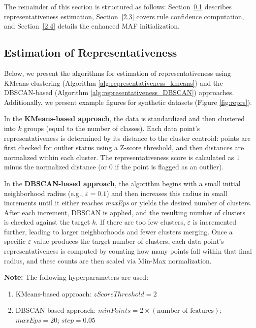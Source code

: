 \documentclass[10pt,a4paper,oneside]{article}
\begin{document}
{\color{red}The remainder of this section is structured as follows: Section~\ref{1.2.1} describes representativeness estimation, Section~\ref{2.3} covers rule confidence computation, and Section~\ref{2.4} details the enhanced MAF initialization.}
\subsection{Estimation of Representativeness}\label{1.2.1}
Below, we present the algorithms for estimation of representativeness using KMeans clustering (Algorithm \ref{alg:representativeness_kmeans}) and the DBSCAN-based (Algorithm \ref{alg:representativeness_DBSCAN}) approaches. Additionally, we present example figures for synthetic datasets (Figure \ref{fig:reprs}).

In the \textbf{KMeans-based approach}, the data is standardized and then clustered into \(k\) groups (equal to the number of classes). Each data point’s representativeness is determined by its distance to the cluster centroid: points are first checked for outlier status using a Z-score threshold, and then distances are normalized within each cluster. The representativeness score is calculated as \(1\) minus the normalized distance (or \(0\) if the point is flagged as an outlier).

In the \textbf{DBSCAN-based approach}, the algorithm begins with a small initial neighborhood radius (e.g., \(\varepsilon = 0.1\)) and then increases this radius in small increments until it either reaches \textit{maxEps} or yields the desired number of clusters. After each increment, DBSCAN is applied, and the resulting number of clusters is checked against the target \(k\). If there are too few clusters, \(\varepsilon\) is incremented further, leading to larger neighborhoods and fewer clusters merging. Once a specific \(\varepsilon\) value produces the target number of clusters, each data point’s representativeness is computed by counting how many points fall within that final radius, and these counts are then scaled via Min-Max normalization.

\textbf{Note:} The following hyperparameters are used:
\begin{enumerate}
    \item KMeans-based approach: $zScoreThreshold = 2$
    \item DBSCAN-based approach: $minPoints = 2 \times (\text{number of features})$; $maxEps = 20$; $step = 0.05$ 
\end{enumerate}
\end{document}
